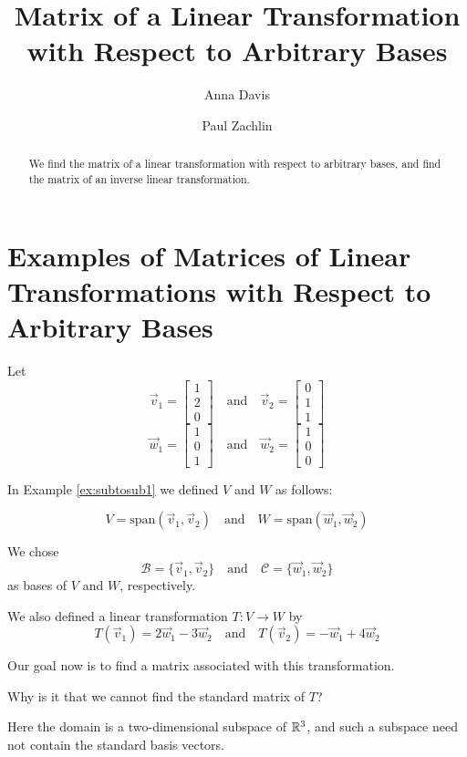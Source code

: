 \documentclass{ximera}
\author{Anna Davis \and Paul Zachlin} \title{Matrix of a Linear Transformation with Respect to Arbitrary Bases} \license{CC-BY 4.0}
\begin{document}
\begin{abstract}
  We find the matrix of a linear transformation with respect to arbitrary bases, and find the matrix of an inverse linear transformation.
\end{abstract}
\maketitle

\section*{Examples of Matrices of Linear Transformations with Respect to  Arbitrary Bases}

\begin{initprob}\label{init:matlintransgeneral}
Let
$$\vec{v}_1=\begin{bmatrix}1\\2\\0\end{bmatrix}\quad\text{and}\quad\vec{v}_2=\begin{bmatrix}0\\1\\1\end{bmatrix}$$
$$\vec{w}_1=\begin{bmatrix}1\\0\\1\end{bmatrix}\quad\text{and}\quad\vec{w}_2=\begin{bmatrix}1\\0\\0\end{bmatrix}$$

In Example \ref{ex:subtosub1} we defined $V$ and $W$ as follows:

$$V=\text{span}(\vec{v}_1, \vec{v}_2)\quad\text{and}\quad W=\text{span}(\vec{w}_1, \vec{w}_2)$$

We chose
$$\mathcal{B}=\{\vec{v}_1, \vec{v}_2\}\quad\text{and}\quad\mathcal{C}=\{\vec{w}_1, \vec{w}_2\}$$
as bases of $V$ and $W$, respectively.

We also defined a linear transformation $T:V\rightarrow W$ by 
$$T(\vec{v}_1)=2\vec{w}_1-3\vec{w}_2\quad\text{and} \quad T(\vec{v}_2)=-\vec{w}_1+4\vec{w}_2$$

Our goal now is to find a matrix associated with this transformation.  

Why is it that we cannot find the standard matrix of $T$?\begin{hint}{Here the domain is a two-dimensional subspace of $\mathbb{R}^3$, and such a subspace need not contain the standard basis vectors.}\end{hint} 


\end{initprob}
\end{document}
